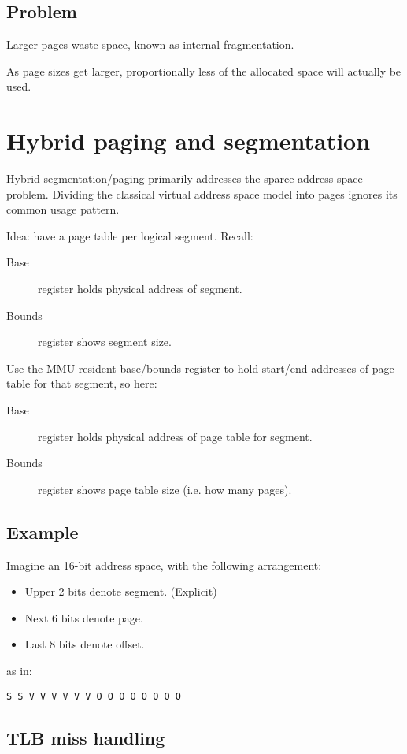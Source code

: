 \subsection{Problem}

Larger pages waste space, known as internal fragmentation.

As page sizes get larger, proportionally less of the allocated space will actually be used.

\section{Hybrid paging and segmentation}

Hybrid segmentation/paging primarily addresses the sparce address space problem.
Dividing the classical virtual address space model into pages ignores its common usage pattern.

Idea: have a page table per logical segment.
Recall:
\begin{description}
\item[Base] register holds physical address of segment.
\item[Bounds] register shows segment size.
\end{description}
Use the MMU-resident base/bounds register to hold start/end addresses of page table for that segment, so here:
\begin{description}
\item[Base] register holds physical address of page table for segment.
\item[Bounds] register shows page table size (i.e. how many pages).
\end{description}

\subsection{Example}

Imagine an 16-bit address space, with the following arrangement:
\begin{itemize}
\item Upper 2 bits denote segment. (Explicit)
\item Next 6 bits denote page.
\item Last 8 bits denote offset.
\end{itemize}
as in:
\begin{verbatim}
S S V V V V V V O O O O O O O O
\end{verbatim}

\subsection{TLB miss handling}


